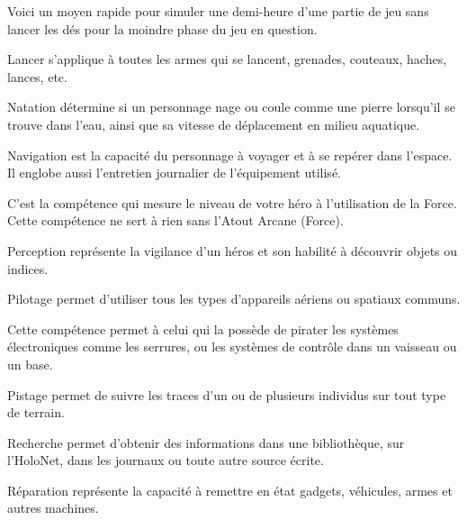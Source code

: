 \begin{description}[align=left]
    \item [Jeu (Int)]
        Voici un moyen rapide pour simuler une demi-heure d’une partie de jeu sans lancer les dés pour la moindre phase du jeu en question.

    \item [Lancer (Agi)]
        Lancer s’applique à toutes les armes qui se lancent, grenades, couteaux, haches, lances, etc.

    \item [Natation (Agi)]
        Natation détermine si un personnage nage ou coule comme une pierre lorsqu’il se trouve dans l’eau, ainsi que sa vitesse de déplacement en milieu aquatique.

    \item [Navigation (Int)]
        Navigation est la capacité du personnage à voyager et à se repérer dans l’espace. Il englobe aussi l’entretien journalier de l’équipement utilisé.

    \item [Maîtrise de la Force (\^Ame)]
        C’est la compétence qui mesure le niveau de votre héro à l’utilisation de la Force. Cette compétence ne sert à rien sans l’Atout Arcane (Force).

    \item [Perception (Int)]
        Perception représente la vigilance d’un héros et son habilité à découvrir objets ou indices.

    \item [Pilotage (Agi)]
        Pilotage permet d’utiliser tous les types d’appareils aériens ou spatiaux communs.

    \item [Piratage (Int)]
        Cette compétence permet à celui qui la possède de pirater les systèmes électroniques comme les serrures, ou les systèmes de contrôle dans un vaisseau ou un base.

    \item [Pistage (Int)]
        Pistage permet de suivre les traces d’un ou de plusieurs individus sur tout type de terrain.

    \item [Recherche (Int)]
        Recherche permet d’obtenir des informations dans une bibliothèque, sur l’HoloNet, dans les journaux ou toute autre source écrite.

    \item [Réparation (Int)]
        Réparation représente la capacité à remettre en état gadgets, véhicules, armes et autres machines.


\end{description}
